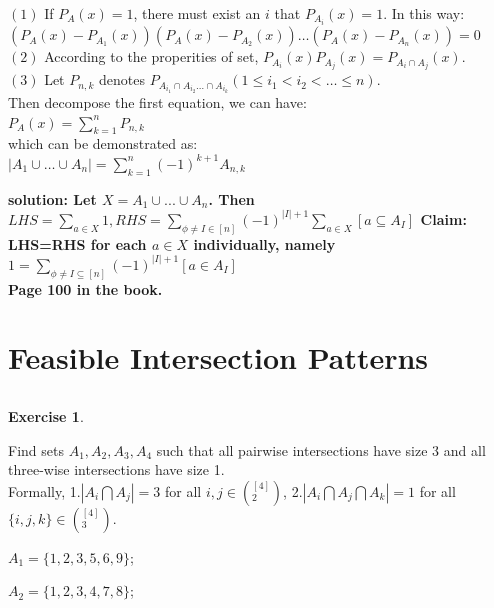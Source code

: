 \documentclass[12pt,a4]{article}
\theoremstyle{exercise}
\newtheorem{exercise}[theorem]{Exercise}
\begin{document}
\begin{enumerate}
    $(1)$ If $P_A(x) = 1$, there must exist an $i$ that $P_{A_i}(x) = 1$. In this way:\\
    $(P_A(x) - P_{A_1}(x))(P_A(x) - P_{A_2}(x))\ldots(P_A(x) - P_{A_n}(x)) = 0$\\

    $(2)$ According to the properities of set, $P_{A_i}(x)P_{A_j}(x) = P_{A_i \cap A_j}(x)$.\\

    $(3)$ Let $P_{n,k}$ denotes $P_{A_{i_1}\cap A_{i_2}\ldots\cap A_{i_k}}(1\le i_1<i_2<\ldots\le n)$.\\
    Then decompose the first equation, we can have:\\
    $P_A(x) = \sum\limits_{k=1}^{n}P_{n,k}$\\
    which can be demonstrated as:\\
     $\left\vert{A_1\cup\ldots\cup A_n}\right\vert = \sum\limits_{k=1}^{n}(-1)^{k+1}A_{n,k}$\\
\end{enumerate}

\textbf{solution: Let $X=A_1\cup...\cup A_n$. Then $LHS= \sum\limits_{a\in X} 1, RHS = \sum\limits_{\phi\neq I\in [n]}(-1)^{|I|+1}\sum\limits_{a\in X}[a\subseteq A_I]$
Claim: LHS=RHS for each $a\in X$ individually, namely $1=\sum\limits_{\phi \neq I\subseteq [n]}(-1)^{|I|+1}[a\in A_I]$\\
Page 100 in the book.}

\section{Feasible Intersection Patterns}

\subsection{}

\begin{exercise}
\end{exercise}
  Find sets $A_1, A_2, A_3, A_4$ such that all pairwise intersections have size 3 and all three-wise intersections have size 1. \\Formally,
 1.$|A_i\bigcap A_j| = 3$ for all ${i,j} \in (^{[4]}_{2})$,
 2.$|A_i\bigcap A_j\bigcap A_k| = 1$ for all $\{i,j,k\}\in (^{[4]}_{3})$.

    
    
    $A_1=\{1,2,3,5,6,9\}$;
    
    $A_2=\{1,2,3,4,7,8\}$;
    
\end{document}
